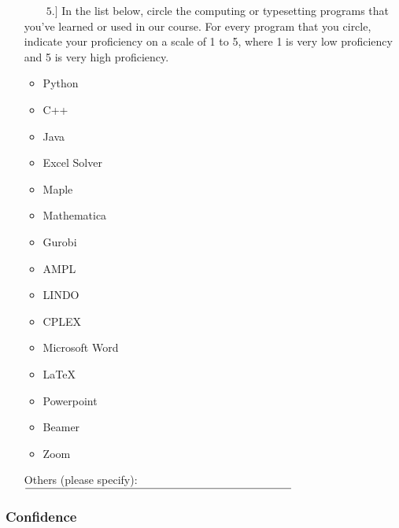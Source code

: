 \documentclass[11pt]{article}
\begin{document}
\begin{enumerate}
\item[{$\qquad 5.]$}] In the list below, circle the computing or typesetting programs that you've learned or used in our course.  For every program that you circle, indicate your proficiency on a scale of 1 to 5, where 1 is very low proficiency and 5 is very high proficiency. 

\begin{minipage}{.3\textwidth}
\begin{itemize}
	\item Python 
	\item C++
	\item Java
	\item Excel Solver
	\item Maple
\end{itemize}
\end{minipage}
\begin{minipage}{.3\textwidth}
\begin{itemize}
	\item Mathematica
	\item Gurobi
	\item AMPL
	\item LINDO	
	\item CPLEX
\end{itemize}
\end{minipage}
\begin{minipage}{.3\textwidth}
\begin{itemize}
	\item Microsoft Word
	\item \LaTeX
	\item Powerpoint
	\item Beamer
	\item Zoom
\end{itemize}
\end{minipage}\vspace{.75cm}

Others (please specify): $\line(1,0){48}\line(1,0){195}$

\end{enumerate}

\subsubsection*{Confidence}
\end{document}
